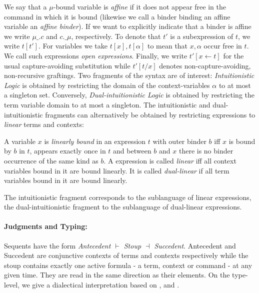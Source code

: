 \documentclass{IOS-Book-Article}
\begin{document}
We say that a $\mu$-bound variable is \emph{affine}  if it does not appear free in the command in which it is bound (likewise we call a binder binding an affine variable an \emph{affine binder}).
If we want to explicitly indicate that a binder is affine we write $\mu\_.c$ and $c.\_\mu$, respectively.
To denote that $t'$ is a subexpression of $t$, we write $t[t']$. For variables we take $t[x], t[\alpha]$ to mean that $x,\alpha$ occur free in $t$. We call such expressions \emph{open expressions}.
Finally, we write $t'[x\leftarrow t]$ for the usual capture-avoiding substitution while $t'[t/x]$ denotes non-capture-avoiding, non-recursive graftings. 
Two fragments of the syntax are of interest:
\emph{Intuitionistic Logic} is obtained by restricting the domain of the context-variables $\alpha$ to at most a singleton set.
Conversely, \emph{Dual-intuitionistic Logic} is obtained by restricting the term variable domain to at most a singleton.
The intuitionistic and dual-intuitionistic fragments can alternatively be obtained by restricting expressions to \emph{linear} terms and contexts:

\begin{definition}
  A variable $x$ is \emph{linearly bound} in an expression $t$ with outer binder $b$ iff $x$ is bound by $b$ in $t$, appears exactly once in $t$ and between $b$ and $x$ there is no binder occurrence of the same kind as $b$. A \matilda expression is called \emph{linear} iff all context variables bound in it are bound linearly. It is called \emph{dual-linear} if all term variables bound in it are bound linearly.
\end{definition}
The intuitionistic fragment corresponds to the sublanguage of linear \matilda expressions, the dual-intuitionistic fragment to the sublanguage of dual-linear \matilda expressions.

\paragraph{Judgments and Typing:} Sequents have the form \emph{Antecedent $\vdash$ Stoup $\dashv$ Succedent}.
Antecedent and Succedent are conjunctive contexts of terms and contexts respectively while the stoup contains exactly one active formula - a term, context or command - at any given time.
They are read in the same direction as their elements.
On the type-level, we give a dialectical interpretation based on \cite{Herbelin2005CestMaintenant}, \cite{LovasCrary2006StructuralNormalization} and \cite{Harper2016PFPL}.
\end{document}
